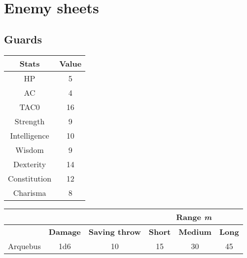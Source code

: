 \section{Enemy sheets}
\subsection{Guards}
\begin{table}[H]
  \centering
\begin{tabular}{|c|c|}
\hline
\rowcolor[HTML]{C0C0C0}
\textbf{Stats} & \textbf{Value } \\ \hline
HP & 5 \\ \hline
AC & 4 \\ \hline
TAC0 & 16 \\ \hline
Strength & 9  \\ \hline
Intelligence & 10 \\ \hline
Wisdom & 9 \\ \hline
Dexterity & 14 \\ \hline
Constitution & 12 \\ \hline
Charisma & 8 \\ \hline
\end{tabular}
\end{table}
\begin{table}[H]
  \centering
  \begin{tabular}{lll|c|c|c|}
    \cline{4-6} & &  & \multicolumn{3}{c|}{\cellcolor[HTML]{C0C0C0}\textbf{Range \textit{m}}} \\ \hline
    \rowcolor[HTML]{C0C0C0}
    \multicolumn{1}{|l|}{\cellcolor[HTML]{C0C0C0}\textbf{Weapon}} & \textbf{Damage} & \textbf{Saving throw} & \multicolumn{1}{l|}{\cellcolor[HTML]{C0C0C0}\textbf{Short}} & \textbf{Medium} & \textbf{Long} \\ \hline
    \multicolumn{1}{|c|}{Arquebus} & \multicolumn{1}{c|}{1d6} & \multicolumn{1}{c|}{10} & 15 & 30 & 45 \\ \hline
  \end{tabular}
\end{table}

